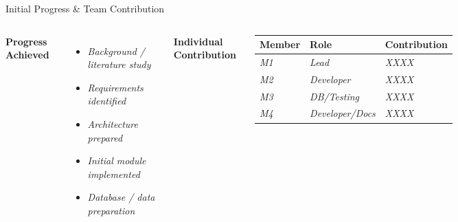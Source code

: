 \documentclass[aspectratio=169,11pt]{beamer}
\newcommand{\placeholder}[1]{\textit{\color{GEUGrey}#1}}
\begin{document}
\begin{frame}{Initial Progress \& Team Contribution}
\begin{columns}[T,totalwidth=\textwidth]
\textbf{\color{GEUBlue}Progress Achieved}
\begin{itemize}\itemsep3pt
\item \placeholder{Background / literature study}
\item \placeholder{Requirements identified}
\item \placeholder{Architecture prepared}
\item \placeholder{Initial module implemented}
\item \placeholder{Database / data preparation}
\end{itemize}
\textbf{\color{GEUBlue}Individual Contribution}
\vspace{2mm}
\scriptsize
\begin{tabularx}{\textwidth}{@{}p{1.8cm}p{2.0cm}X@{}}
\toprule
Member & Role & Contribution\\
\midrule
\placeholder{M1} & \placeholder{Lead} & \placeholder{XXXX}\\
\placeholder{M2} & \placeholder{Developer} & \placeholder{XXXX}\\
\placeholder{M3} & \placeholder{DB/Testing} & \placeholder{XXXX}\\
\placeholder{M4} & \placeholder{Developer/Docs} & \placeholder{XXXX}\\
\bottomrule
\end{tabularx}
\end{columns}
\end{frame}
\end{document}
